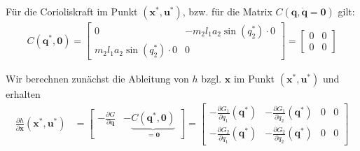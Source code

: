 \documentclass[a4paper, 12pt]{scrartcl}
\begin{document}
Für die Corioliskraft im Punkt $(\bm{x}^*,\bm{u}^*)$, 
bzw. für die Matrix $C(\bm{q}, \dot{\bm{q}}= \bm{0})$ gilt:
%
\begin{align*}
    C(\bm{q}^*, \bm{0}) 
    =
    \begin{bmatrix}
        0 & -m_2 l_1 a_2 \sin(q_2^*) \cdot 0 \\
        m_2 l_1 a_2 \sin(q_2^*) \cdot 0 & 0
    \end{bmatrix}
    =
    \begin{bmatrix}
        0 & 0 \\
        0 & 0
    \end{bmatrix}
\end{align*}

Wir berechnen zunächst die Ableitung von $h$ bzgl. $\bm{x}$ im Punkt $(\bm{x}^*, \bm{u}^*)$ 
und erhalten
\begin{align*}
    \frac{\partial h}{\partial \bm{x}}(\bm{x}^*, \bm{u}^*)
    &=
    \begin{bmatrix}
        - \frac{\partial G}{\partial \bm{q}} & - \underbrace{C(\bm{q}^*, \bm{0})}_{= \bm{0}}
    \end{bmatrix}
    =
    \begin{bmatrix}
        - \frac{\partial G_1}{\partial q_1}(\bm{q}^*) 
        & - \frac{\partial G_1}{\partial q_2}(\bm{q}^*) 
        & 0 & 0 \\
        - \frac{\partial G_2}{\partial q_1}(\bm{q}^*) 
        & - \frac{\partial G_2}{\partial q_2}(\bm{q}^*) 
        & 0 & 0
    \end{bmatrix}
\end{align*}
\end{document}
